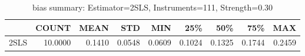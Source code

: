 \begin{table}[ht]
\centering
\caption{bias summary: Estimator=2SLS, Instruments=111, Strength=0.30}
\begin{tabular}{lrrrrrrrr}
\toprule
 & COUNT & MEAN & STD & MIN & 25\% & 50\% & 75\% & MAX \\
\midrule
2SLS & 10.0000 & 0.1410 & 0.0548 & 0.0609 & 0.1024 & 0.1325 & 0.1744 & 0.2459 \\
\bottomrule
\end{tabular}
\end{table}
